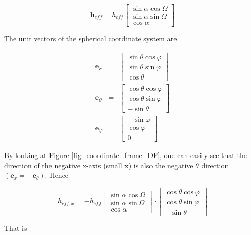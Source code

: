 \documentclass[a4paper,14pt]{extbook}
\begin{document}
\begin{equation}
\textbf{h}_{eff} = h_{eff}\left[ \begin{array}{c}
\sin \alpha \cos \Omega\\
\sin \alpha \sin \Omega\\
\cos \alpha
\end{array}  \right]
\end{equation}

The unit vectors of the spherical coordinate system are

\begin{eqnarray}
\textbf{e}_r &=& \left[ \begin{array}{c}
\sin \theta \cos \varphi\\
\sin \theta \sin \varphi\\
\cos \theta
\end{array}  \right] \\
\textbf{e}_\theta &=& \left[ \begin{array}{c}
\cos \theta \cos \varphi\\
\cos \theta \sin \varphi\\
-\sin \theta
\end{array}  \right] \\
\textbf{e}_\varphi &=& \left[ \begin{array}{c}
-\sin  \varphi\\
\cos \varphi\\
0
\end{array}  \right]
\end{eqnarray}

By looking at Figure \ref{fig_coordinate_frame_DF}, one can easily see that the direction of the negative x-axis (small x) is also the negative $\theta$ direction  $(\textbf{e}_x=-\textbf{e}_\theta)$. Hence

\begin{equation}
{h}_{eff,x} = -h_{eff} \left[ \begin{array}{c}
\sin \alpha \cos \Omega\\
\sin \alpha \sin \Omega\\
\cos \alpha
\end{array}  \right] \cdot \left[ \begin{array}{c}
\cos \theta \cos \varphi\\
\cos \theta \sin \varphi\\
-\sin \theta
\end{array}  \right]
\end{equation}

That is
\end{document}

